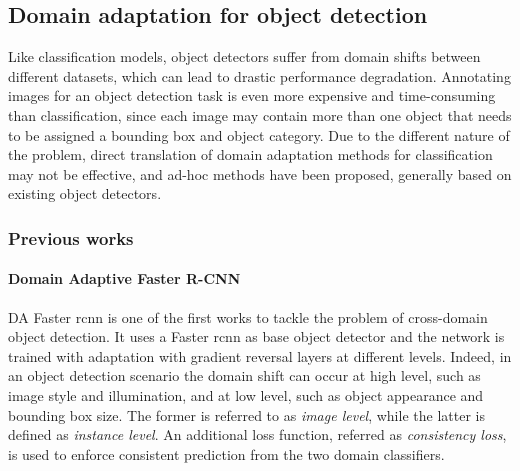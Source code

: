 \documentclass[%
    corpo=12pt,
    twoside,
    stile=classica,   
    tipotesi=magistrale,
    evenboxes,
    english,
	numerazioneromana,
]{toptesi}
\begin{document}

\subsection{Domain adaptation for object detection}
Like classification models, object detectors suffer from domain shifts between different datasets, which can lead to drastic performance degradation. Annotating images for an object detection task is even more expensive and time-consuming than classification, since each image may contain more than one object that needs to be assigned a bounding box and object category. Due to the different nature of the problem, direct translation of domain adaptation methods for classification may not be effective, and ad-hoc methods have been proposed, generally based on existing object detectors.

\subsubsection{Previous works}
\paragraph{Domain Adaptive Faster R-CNN}\label{sec:dafrcnn}
DA Faster \acrshort{rcnn}\cite{chen2018domain} is one of the first works to tackle the problem of cross-domain object detection. It uses a Faster \acrshort{rcnn} as base object detector and the network is trained with adaptation with gradient reversal layers at different levels. Indeed, in an object detection scenario the domain shift can occur at high level, such as image style and illumination, and at low level, such as object appearance and bounding box size. The former is referred to as \textit{image level}, while the latter is defined as \textit{instance level}. An additional loss function, referred as \textit{consistency loss}, is used to enforce consistent prediction from the two domain classifiers.
\end{document}
